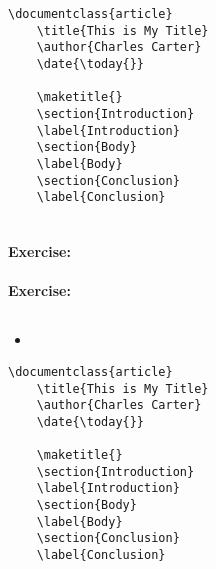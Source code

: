         \begin{verbatim}
\documentclass{article}
    \title{This is My Title}
    \author{Charles Carter}
    \date{\today{}}
 
    \maketitle{}
    \section{Introduction}
    \label{Introduction}
    \section{Body}
    \label{Body}
    \section{Conclusion}
    \label{Conclusion}
    
        \end{verbatim}

        \paragraph{Exercise:}

        \paragraph{Exercise:}

        \subsection{}
        \label{}
        
        \begin{framed}
            \begin{itemize}
                \item{}
            \end{itemize}
        \end{framed}


        \begin{verbatim}
\documentclass{article}
    \title{This is My Title}
    \author{Charles Carter}
    \date{\today{}}
 
    \maketitle{}
    \section{Introduction}
    \label{Introduction}
    \section{Body}
    \label{Body}
    \section{Conclusion}
    \label{Conclusion}
    
        \end{verbatim}

